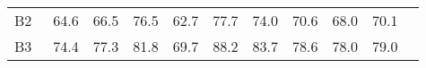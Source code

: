 \documentclass[9pt,journal,letterpaper,twocolumn]{IEEEtran}
\begin{document}
{\begin{table}[!t]
{\begin{tabular}{lcccccccccc}
			\\
			\hspace{-0.5em}B2  & \hspace{-0.5em}~64.6\hspace{-0.5em}&	\hspace{-0.5em}66.5\hspace{-0.5em}&	\hspace{-0.5em}76.5\hspace{-0.5em}&	\hspace{-0.5em}62.7\hspace{-0.5em}&	\hspace{-0.5em}77.7\hspace{-0.5em}&	\hspace{-0.5em}74.0\hspace{-0.5em}&	\hspace{-0.5em}70.6\hspace{-0.5em}&	\hspace{-0.5em}68.0\hspace{-0.5em}&	\hspace{-0.5em}70.1\hspace{-0.5em}
			\\
			\hspace{-0.5em}B3 & \hspace{-0.5em}~74.4\hspace{-0.5em}&	\hspace{-0.5em}77.3\hspace{-0.5em}&	\hspace{-0.5em}81.8\hspace{-0.5em}&	\hspace{-0.5em}69.7\hspace{-0.5em}&	\hspace{-0.5em}88.2\hspace{-0.5em}&	\hspace{-0.5em}83.7\hspace{-0.5em}&	\hspace{-0.5em}78.6\hspace{-0.5em}&	\hspace{-0.5em}78.0\hspace{-0.5em}&	\hspace{-0.5em}79.0\hspace{-0.5em}	
			\\

\end{tabular}}
\end{table}}
\end{document}
